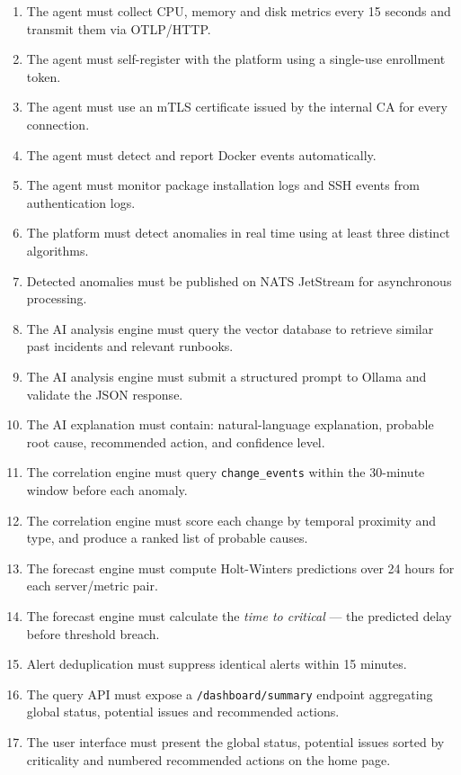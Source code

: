\begin{enumerate}[label=\textbf{FR\arabic*}, leftmargin=2.2cm, itemsep=4pt]
  \item The agent must collect CPU, memory and disk metrics every 15 seconds and transmit them via OTLP/HTTP.
  \item The agent must self-register with the platform using a single-use enrollment token.
  \item The agent must use an mTLS certificate issued by the internal CA for every connection.
  \item The agent must detect and report Docker events automatically.
  \item The agent must monitor package installation logs and SSH events from authentication logs.
  \item The platform must detect anomalies in real time using at least three distinct algorithms.
  \item Detected anomalies must be published on NATS JetStream for asynchronous processing.
  \item The AI analysis engine must query the vector database to retrieve similar past incidents and relevant runbooks.
  \item The AI analysis engine must submit a structured prompt to Ollama and validate the JSON response.
  \item The AI explanation must contain: natural-language explanation, probable root cause, recommended action, and confidence level.
  \item The correlation engine must query \texttt{change\_events} within the 30-minute window before each anomaly.
  \item The correlation engine must score each change by temporal proximity and type, and produce a ranked list of probable causes.
  \item The forecast engine must compute Holt-Winters predictions over 24 hours for each server/metric pair.
  \item The forecast engine must calculate the \textit{time to critical} — the predicted delay before threshold breach.
  \item Alert deduplication must suppress identical alerts within 15 minutes.
  \item The query API must expose a \texttt{/dashboard/summary} endpoint aggregating global status, potential issues and recommended actions.
  \item The user interface must present the global status, potential issues sorted by criticality and numbered recommended actions on the home page.

\end{enumerate}
